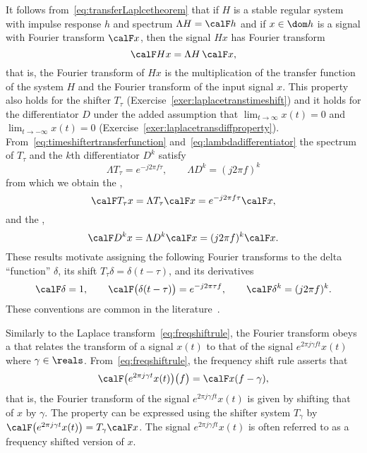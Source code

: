 It follows from~\eqref{eq:transferLaplcetheorem} that if $H$ is a stable regular system with impulse response $h$ and spectrum $\Lambda H = \calF h$ and if $x \in \dom h$ is a signal with Fourier transform $\calF x$, then the signal $H x$ has Fourier transform
\begin{equation}\label{eq:fouriertransoutputsig}
\calF H x = \Lambda H \, \calF x,
\end{equation}
that is, the Fourier transform of $Hx$ is the multiplication of the transfer function of the system $H$ and the Fourier transform of the input signal $x$.  This property also holds for the shifter $T_\tau$ (Exercise~\ref{exer:laplacetranstimeshift}) and it holds for the differentiator $D$ under the added assumption that $\lim_{t \to \infty}x(t) = 0$ and $\lim_{t \to -\infty} x(t) = 0$ (Exercise~\ref{exer:laplacetransdiffproperty}).  From~\eqref{eq:timeshiftertransferfunction} and~\eqref{eq:lambdadifferentiator} the spectrum of $T_\tau$ and the $k$th differentiator $D^k$ satisfy 
\[
\Lambda T_\tau = e^{-j2\pi f \tau}, \qquad \Lambda D^k = (j2\pi f)^k
\]
from which we obtain the ,
 \[
 \calF T_\tau x = \Lambda T_\tau \calF x = e^{-j2\pi f \tau} \calF x,
\]
and the ,
\[
 \calF D^k x = \Lambda D^k \calF x =  (j2\pi f)^k \calF x.
\]
These results motivate assigning the following Fourier transforms to the delta ``function'' $\delta$, its shift $T_\tau \delta = \delta(t - \tau)$, and its derivatives
\begin{equation}\label{eqftsofdeltas}
\calF \delta = 1, \qquad \calF\big(\delta(t - \tau)\big) = e^{-j2\pi\tau f}, \qquad \calF \delta^k = (j2\pi f)^k.
\end{equation}
These conventions are common in the literature~\citep{Oppenheiim_sigs_sys_1996}.

Similarly to the Laplace transform~\eqref{eq:freqshiftrule}, the Fourier transform obeys a  that relates the transform of a signal $x(t)$ to that of the signal $e^{2\pi j \gamma f t} x(t)$ where $\gamma \in \reals$.  From~\eqref{eq:freqshiftrule}, the frequency shift rule asserts that
\begin{align}
\calF\big( e^{2\pi j \gamma t} x(t) \big)\big( f\big) =  \calF x(f - \gamma), \label{eq:freqshiftrulefourier}
\end{align}
that is, the Fourier transform of the signal $e^{2\pi j \gamma f t} x(t)$ is given by shifting that of $x$ by $\gamma$.  The property can be expressed using the shifter system $T_\gamma$ by $\calF \big( e^{2\pi j \gamma t} x(t) \big) = T_\gamma \calF x$.  The signal $e^{2\pi j \gamma f t} x(t)$ is often referred to as a frequency shifted version of $x$.
 
